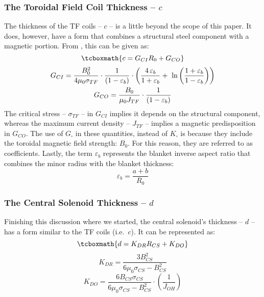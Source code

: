 \subsubsection{The Toroidal Field Coil Thickness -- $c$}

The thickness of the TF coils -- $c$ -- is a little beyond the scope of this paper. It does, however, have a form that combines a structural steel component with a magnetic portion. From , this can be given as: \cite{minervini}
\begin{equation}
	\label{eq:cc}
	\tcboxmath{
	c = G_{CI} R_0 + G_{CO}
	}
\end{equation}
\begin{gather}
	G_{CI} = \frac{B_{0}^2}{ 4 \mu_0 \sigma_{TF} } \cdot \frac{1}{ ( 1 - \varepsilon_b )}  \cdot \left( \frac{ 4 \, \varepsilon_b}{1+\varepsilon_b} + \ \textnormal{ln} \left( \frac{1+\varepsilon_b}{1-\varepsilon_b} \right) \right) \\
	G_{CO} = \frac{B_{0}}{ \mu_0 J_{TF} } \cdot \frac{1}{ ( 1 - \varepsilon_b )}
\end{gather}
The critical stress -- $\sigma_{TF}$ -- in $G_{CI}$ implies it depends on the structural component, whereas the maximum current density -- $J_{TF}$ -- implies a magnetic predisposition in $G_{CO}$. The use of $G_\square$ in these quantities, instead of $K_\square$ is because they include the toroidal magnetic field strength: $B_0$. For this reason, they are referred to as  coefficients. Lastly, the term $\varepsilon_b$ represents the blanket inverse aspect ratio that combines the minor radius with the blanket thickness:
\begin{equation}
	\varepsilon_b = \frac{ a + b }{R_0}
\end{equation}

\subsubsection{The Central Solenoid Thickness -- $d$}

Finishing this discussion where we started, the central solenoid's thickness -- $d$ -- has a form similar to the TF coils (i.e.\ $c$). It can be represented as: \cite{minervini}
 \begin{equation}
 	\label{eq:dd}
 	\tcboxmath{
	d = K_{DR} R_{CS} + K_{DO}
	}
\end{equation}
\begin{equation}
	K_{DR} = \frac{3 B_{CS}^2}{ 6 \mu_0 \sigma_{CS}  - B_{CS}^2 }
\end{equation}
\begin{equation}
	K_{DO} = \frac{6 B_{CS} \sigma_{CS}}{ 6 \mu_0 \sigma_{CS}  - B_{CS}^2 } \cdot \left( \frac{1}{J_{OH}} \right)
\end{equation}

